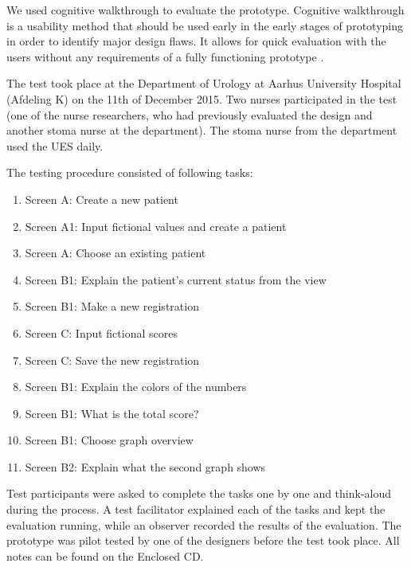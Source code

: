 

We used cognitive walkthrough to evaluate the prototype. Cognitive walkthrough is a usability method that should be used early in the early stages of prototyping in order to identify major design flaws. It allows for quick evaluation with the users without any requirements of a fully functioning prototype  \citep{usability}. 

The test took place at the Department of Urology at Aarhus University Hospital (Afdeling K) on the 11th of December 2015. Two nurses participated in the test (one of the nurse researchers, who had previously evaluated the design and another stoma nurse at the department). The stoma nurse from the department used the UES daily. 

The testing procedure consisted of following tasks: 
\begin{enumerate}
\item Screen A: Create a new patient 
\item Screen A1: Input fictional values and create a patient
\item Screen A: Choose an existing patient 
\item Screen B1: Explain the patient's current status from the view
\item Screen B1: Make a new registration 
\item Screen C: Input fictional scores 
\item Screen C: Save the new registration 
\item Screen B1: Explain the colors of the numbers
\item Screen B1: What is the total score?
\item Screen B1: Choose graph overview
\item Screen B2: Explain what the second graph shows 
\end{enumerate}

Test participants were asked to complete the tasks one by one and think-aloud during the process. A test facilitator explained each of the tasks and kept the evaluation running, while an observer recorded the results of the evaluation. The prototype was pilot tested by one of the designers before the test took place. All notes can be found on the Enclosed CD. 

